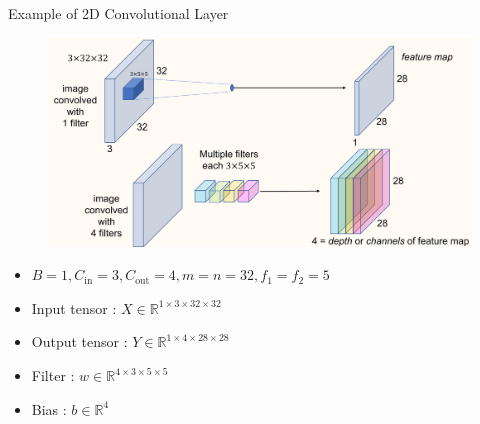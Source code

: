 \begin{frame}[allowframebreaks]

\begin{myexampleblock}{5.4}{Example of 2D Convolutional Layer}
    \begin{figure}[H]
        \centering
        \includegraphics[width=1.0\textwidth]{.././assets/5.2.png}
    \end{figure}

    \begin{itemize}
        \item $B = 1, C_{\text{in}} = 3, C_{\text{out}} = 4, m=n=32, f_1=f_2=5$
        \item Input tensor : $X \in \mathbb{R}^{1 \times 3 \times 32 \times 32}$
        \item Output tensor : $Y \in \mathbb{R}^{1 \times 4 \times 28 \times 28}$
        \item Filter : $w \in \mathbb{R}^{4 \times 3 \times 5 \times 5}$
        \item Bias : $b \in \mathbb{R}^{4}$
    \end{itemize}
\end{myexampleblock}

\end{frame}

